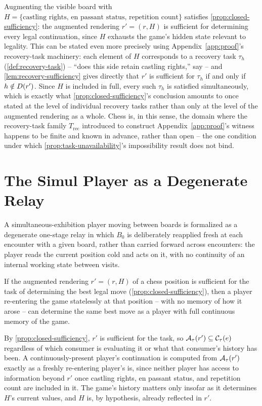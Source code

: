 Augmenting the visible board with $H = \{\text{castling rights, en
passant status, repetition count}\}$ satisfies \cref{prop:closed-sufficiency}:
the augmented rendering $r' = (r, H)$ is sufficient for determining every
legal continuation, since $H$ exhausts the game's hidden state relevant
to legality. This can be stated even more precisely using
Appendix~\ref{app:proof}'s recovery-task machinery: each element of $H$
corresponds to a recovery task $\tau_h$ (\cref{def:recovery-task}) --
``does this side retain castling rights,'' say -- and
\cref{lem:recovery-sufficiency} gives directly that $r'$ is sufficient
for $\tau_h$ if and only if $h \notin D(r')$. Since $H$ is
included in full, every such $\tau_h$ is satisfied simultaneously, which
is exactly what \cref{prop:closed-sufficiency}'s conclusion amounts to
once stated at the level of individual recovery tasks rather than only
at the level of the augmented rendering as a whole. Chess is, in this
sense, the domain where the recovery-task family $T_{\mathrm{rec}}$
introduced to construct Appendix~\ref{app:proof}'s witness happens to be
finite and known in advance, rather than open -- the one condition
under which \cref{prop:task-unavailability}'s impossibility result does
not bind.

\section{The Simul Player as a Degenerate Relay}

A simultaneous-exhibition player moving between boards is formalized as a
degenerate one-stage relay in which $B_0$ is deliberately reapplied fresh
at each encounter with a given board, rather than carried forward across
encounters: the player reads the current position cold and acts on it,
with no continuity of an internal working state between visits.

\begin{proposition}
\label{prop:stateless-reentry}
If the augmented rendering $r' = (r, H)$ of a chess position is
sufficient for the task of determining the best legal move
(\cref{prop:closed-sufficiency}), then a player re-entering the game
statelessly at that position -- with no memory of how it arose -- can
determine the same best move as a player with full continuous memory of
the game.
\end{proposition}

\begin{proofsketch}
By \cref{prop:closed-sufficiency}, $r'$ is sufficient for the task, so
$\mathcal{A}_{\tau}(r') \subseteq \mathcal{C}_\tau(e)$ regardless of which
consumer is evaluating it or what that consumer's history has been. A
continuously-present player's continuation is computed from
$\mathcal{A}_{\tau}(r')$ exactly as a freshly re-entering player's is, since
neither player has access to information beyond $r'$ once castling
rights, en passant status, and repetition count are included in it. The
game's history matters only insofar as it determines $H$'s current
values, and $H$ is, by hypothesis, already reflected in $r'$.
\end{proofsketch}

